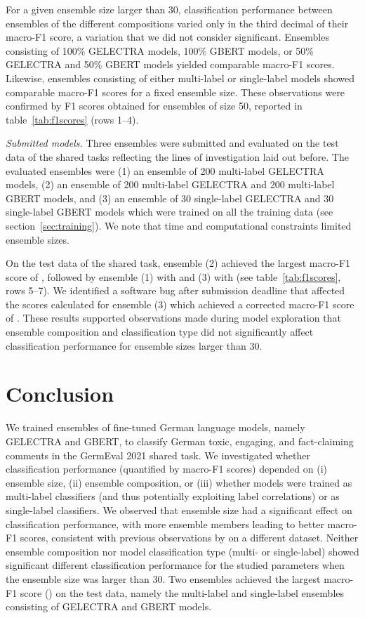 \documentclass[11pt,a4paper]{article}
\begin{document}
For a given ensemble size larger than 30, classification performance between ensembles of the different compositions varied only in the third decimal of their macro-F1 score, a variation that we did not consider significant. Ensembles consisting of 100\% GELECTRA models, 100\% GBERT models, or 50\% GELECTRA and 50\% GBERT models yielded comparable macro-F1 scores. Likewise, ensembles consisting of either multi-label or \mbox{single-label} models showed comparable macro-F1 scores for a fixed ensemble size. These observations were confirmed by F1 scores obtained for ensembles of size 50, reported in table~\ref{tab:f1scores} (rows 1--4).

\emph{Submitted models.} Three ensembles were submitted and evaluated on the test data of the shared tasks reflecting the lines of investigation laid out before. The evaluated ensembles were (1) an ensemble of 200 multi-label GELECTRA models, (2) an ensemble of 200 multi-label GELECTRA and 200 multi-label GBERT models, and (3) an ensemble of 30 single-label GELECTRA and 30 single-label GBERT models which were trained on all the training data (see section~\ref{sec:training}). We note that time and computational constraints limited ensemble sizes.

On the test data of the shared task, ensemble (2) achieved the largest macro-F1 score of , followed by ensemble (1) with  and (3) with  (see table~\ref{tab:f1scores}, rows 5--7). We identified a software bug after submission deadline that affected the scores calculated for ensemble (3) which achieved a corrected macro-F1 score of . These results supported observations made during model exploration that ensemble composition and classification type did not significantly affect classification performance for ensemble sizes larger than 30.


\section{Conclusion}
We trained ensembles of fine-tuned German language models, namely GELECTRA and GBERT, to classify German
toxic, engaging, and \mbox{fact-claiming} comments in the GermEval 2021 shared task. We investigated whether classification performance (quantified by macro-F1 scores) depended on (i) ensemble size, (ii) ensemble composition, or (iii) whether models were trained as multi-label classifiers (and thus potentially exploiting label correlations) or as single-label classifiers. We observed that ensemble size had a significant effect on classification performance, with more ensemble members leading to better macro-F1 scores, consistent with previous observations by \citet{Risch2020} on a different dataset. Neither ensemble composition nor model classification type (multi- or single-label) showed significant different classification performance for the studied parameters when the ensemble size was larger than 30. Two ensembles achieved the largest macro-F1 score () on the test data, namely the multi-label and single-label ensembles consisting of GELECTRA and GBERT models.
\end{document}
